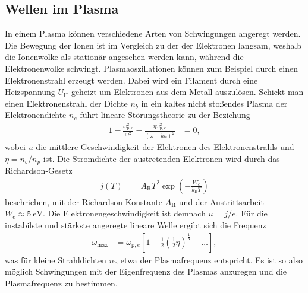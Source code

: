 \subsection{Wellen im Plasma}
In einem Plasma k\"onnen verschiedene Arten von Schwingungen angeregt werden.
Die Bewegung der Ionen ist im Vergleich zu der der Elektronen langsam, weshalb die Ionenwolke als station\"ar angesehen werden kann, w\"ahrend die Elektronenwolke schwingt.
Plasmaoszillationen k\"onnen zum Beispiel durch einen Elektronenstrahl erzeugt werden.
Dabei wird ein Filament durch eine Heizspannung $U_\text{H}$ geheizt um Elektronen aus dem Metall auszul\"osen.
Schickt man einen Elektronenstrahl der Dichte $n_b$ in ein kaltes nicht sto\ss endes Plasma der Elektronendichte $n_e$ f\"uhrt lineare St\"orungstheorie zu der Beziehung
\begin{align}
1-\frac{\omega_{\text{p},e}^2}{\omega^2}-\frac{\eta\omega_{\text{p},e}^2}{(\omega-ku)^2}
    &=0,
    \label{eq:rel1}
\end{align}
wobei $u$ die mittlere Geschwindigkeit der Elektronen des Elektronenstrahls und $\eta=n_b/n_p$ ist.
\cite{shirkawa93a}
Die Stromdichte der austretenden Elektronen wird durch das Richardson-Gesetz
\begin{align}
j(T)
    &=A_\text{R}T^2\exp(-\frac{W_e}{k_\text{B}T})
\end{align}
beschrieben, mit der Richardson-Konstante $A_\text{R}$ und der Austrittsarbeit $W_e\approx \SI{5}{\electronvolt}$.
Die Elektronengeschwindigkeit ist demnach $u=j/e$.
\cite{anleitung2}
F\"ur die instabilste und st\"arkste angeregte lineare Welle ergibt sich die Frequenz
\begin{align}
\omega_\text{max}
    &=\omega_{\text{p},e}\left[ 1-\frac{1}{2}\left(\frac{1}{2}\eta\right)^{\frac{1}{3}}+\ldots\right],
    \label{eq:wmax}
\end{align}
was f\"ur kleine Strahldichten $n_\text{b}$ etwa der Plasmafrequenz entspricht.
Es ist so also m\"oglich Schwingungen mit der Eigenfrequenz des Plasmas anzuregen und die Plasmafrequenz zu bestimmen.
\cite{shirkawa93a}

